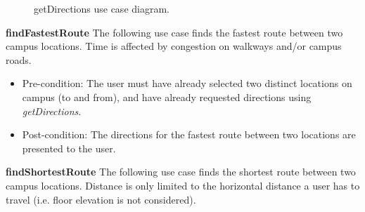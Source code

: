 \documentclass[12pt,a4paper]{article}
\begin{document}

			\begin{figure}[ht!]
				\caption \newline getDirections use case diagram.
			\end{figure}

		    \textbf{findFastestRoute}
			The following use case finds the fastest route between two campus locations. Time is affected by congestion on 				    walkways and/or campus roads.

			\begin{itemize}
			\item Pre-condition: The user must have already selected two distinct locations on campus (to and from), and have 					  already requested directions using \textit{getDirections}.
			\item Post-condition: The directions for the fastest route between two locations are presented to the user.
			\end{itemize}

			\textbf{findShortestRoute}
			The following use case finds the shortest route between two campus locations. Distance is only limited to the 				    horizontal distance a user has to travel (i.e. floor elevation is not considered).


\end{document}
\end{itemize}
\end{document}

